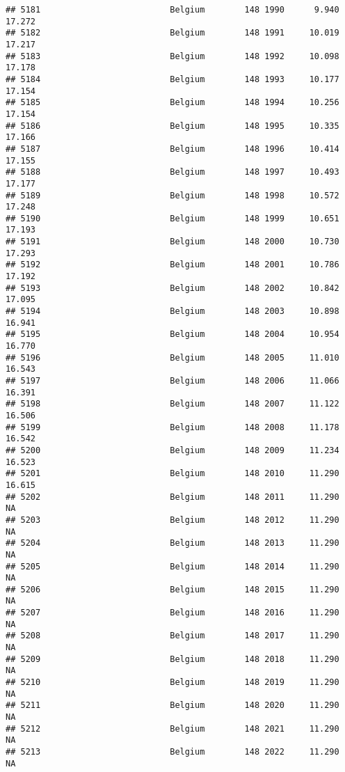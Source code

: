 \documentclass[
]{article}
\begin{document}
\begin{verbatim}
## 5181                          Belgium        148 1990      9.940     17.272
## 5182                          Belgium        148 1991     10.019     17.217
## 5183                          Belgium        148 1992     10.098     17.178
## 5184                          Belgium        148 1993     10.177     17.154
## 5185                          Belgium        148 1994     10.256     17.154
## 5186                          Belgium        148 1995     10.335     17.166
## 5187                          Belgium        148 1996     10.414     17.155
## 5188                          Belgium        148 1997     10.493     17.177
## 5189                          Belgium        148 1998     10.572     17.248
## 5190                          Belgium        148 1999     10.651     17.193
## 5191                          Belgium        148 2000     10.730     17.293
## 5192                          Belgium        148 2001     10.786     17.192
## 5193                          Belgium        148 2002     10.842     17.095
## 5194                          Belgium        148 2003     10.898     16.941
## 5195                          Belgium        148 2004     10.954     16.770
## 5196                          Belgium        148 2005     11.010     16.543
## 5197                          Belgium        148 2006     11.066     16.391
## 5198                          Belgium        148 2007     11.122     16.506
## 5199                          Belgium        148 2008     11.178     16.542
## 5200                          Belgium        148 2009     11.234     16.523
## 5201                          Belgium        148 2010     11.290     16.615
## 5202                          Belgium        148 2011     11.290         NA
## 5203                          Belgium        148 2012     11.290         NA
## 5204                          Belgium        148 2013     11.290         NA
## 5205                          Belgium        148 2014     11.290         NA
## 5206                          Belgium        148 2015     11.290         NA
## 5207                          Belgium        148 2016     11.290         NA
## 5208                          Belgium        148 2017     11.290         NA
## 5209                          Belgium        148 2018     11.290         NA
## 5210                          Belgium        148 2019     11.290         NA
## 5211                          Belgium        148 2020     11.290         NA
## 5212                          Belgium        148 2021     11.290         NA
## 5213                          Belgium        148 2022     11.290         NA

\end{verbatim}
\end{document}
